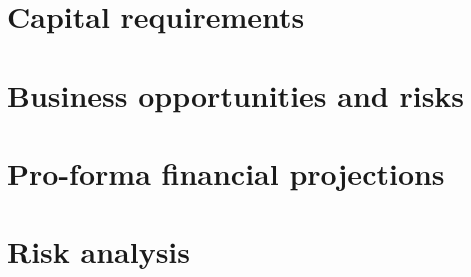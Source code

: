 \documentclass{article}
\begin{document}
\newpage
\section{Capital requirements}
\section{Business opportunities and risks}
\section{Pro-forma financial projections}
\section{Risk analysis}
\end{document}
